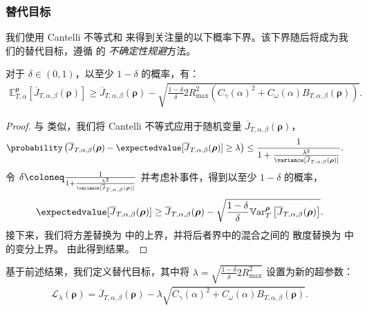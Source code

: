 \subsubsection{替代目标}
\label{subsec:surrogate_objective}

我们使用 Cantelli 不等式和  来得到关注量的以下概率下界。该下界随后将成为我们的替代目标，遵循 \cite{metelli2018policy} 的 \emph{不确定性规避}方法。

\begin{thm}
\label{th:bound_surrogate_objective}
    对于 $\delta\in (0,1)$，以至少 $1-\delta$ 的概率，有：
\begin{align*}
    \mathbb{E}_{T,\alpha}^{\boldsymbol\rho}\left[\overline{J}_{T,\alpha,\beta}(\boldsymbol\rho) \right]
    \geq
    \overline{J}_{T,\alpha,\beta}(\boldsymbol\rho)  - \sqrt{\frac{1-\delta}{\delta} 2R_{\max}^2 \left( C_\gamma(\alpha)^2 + C_\omega(\alpha) {B}_{T,\alpha,\beta}(\boldsymbol\rho)\right)}.
\end{align*}
\end{thm}
\begin{proof}
    与 \cite{metelli2018policy} 类似，我们将 Cantelli 不等式应用于随机变量 $\overline{J}_{T,\alpha,\beta}(\boldsymbol\rho)$，
    \begin{align*}
        \probability\left( \overline{J}_{T,\alpha,\beta}(\boldsymbol\rho) - \expectedvalue[\overline{J}_{T,\alpha,\beta}(\boldsymbol\rho)]\geq \lambda\right) &\leq \frac{1}{1+\frac{\lambda^2}{\variance[\overline{J}_{T,\alpha,\beta}(\boldsymbol\rho)]}}.
    \end{align*}
    令 $\delta \coloneq \frac{1}{1+\frac{\lambda^2}{\variance[\overline{J}_{T,\alpha,\beta}(\boldsymbol\rho)]}}$ 并考虑补事件，得到以至少 $1-\delta$ 的概率，
    \begin{align*}
        \expectedvalue[\overline{J}_{T,\alpha,\beta}(\boldsymbol\rho)]\geq  \overline{J}_{T,\alpha,\beta}(\boldsymbol\rho) -
        \sqrt{
            \frac{1-\delta}{\delta}  \mathbb{V}\mathrm{ar}^{\boldsymbol\rho}_T \left[\overline{J}_{T,\alpha,\beta}(\boldsymbol\rho)\right]
        }.
    \end{align*}
    接下来，我们将方差替换为  中的上界，并将后者界中的混合之间的 \Renyi 散度替换为  中的变分上界。
    由此得到结果。
\end{proof}

基于前述结果，我们定义替代目标，其中将 $\textstyle\lambda = \sqrt{\frac{1-\delta}{\delta} 2 R_{\max}^2 }$ 设置为新的超参数：
\begin{align}
    \mathcal{L}_{\lambda}(\boldsymbol\rho) = \overline{J}_{T,\alpha,\beta}(\boldsymbol\rho) - \lambda  \sqrt{C_\gamma(\alpha)^2+C_\omega(\alpha) B_{T,\alpha,\beta}(\boldsymbol\rho)}.
    \label{eq:objective}
\end{align}

